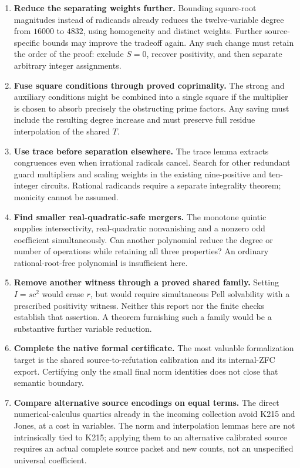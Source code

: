 \documentclass[11pt,a4paper]{article}
\theoremstyle{definition}\newtheorem{definition}[theorem]{Definition}
\theoremstyle{remark}\newtheorem{remark}[theorem]{Remark}
\numberwithin{equation}{section}
\begin{document}
\begin{enumerate}
\item \textbf{Reduce the separating weights further.} Bounding square-root
magnitudes instead of radicands already reduces the twelve-variable degree
from $16000$ to $4832$, using homogeneity and distinct weights. Further
source-specific bounds may improve the tradeoff again.
Any such change must retain the order of the proof: exclude $S=0$,
recover positivity, and then separate arbitrary integer assignments.
\item \textbf{Fuse square conditions through proved coprimality.} The
strong and auxiliary conditions might be combined into a single square
if the multiplier is chosen to absorb precisely the obstructing prime
factors. Any saving must include the resulting degree increase and must
preserve full residue interpolation of the shared $T$.
\item \textbf{Use trace before separation elsewhere.} The trace lemma
extracts congruences even when irrational radicals cancel. Search for
other redundant guard multipliers and scaling weights in the existing
nine-positive and ten-integer circuits. Rational radicands require a
separate integrality theorem; monicity cannot be assumed.
\item \textbf{Find smaller real-quadratic-safe mergers.} The monotone
quintic supplies intersectivity, real-quadratic nonvanishing and a
nonzero odd coefficient simultaneously. Can another polynomial reduce
the degree or number of operations while retaining all three properties?
An ordinary rational-root-free polynomial is insufficient here.
\item \textbf{Remove another witness through a proved shared family.}
Setting $I=sc^2$ would erase $r$, but would require simultaneous Pell
solvability with a prescribed positivity witness. Neither this report nor
the finite checks establish that assertion. A theorem furnishing such a
family would be a substantive further variable reduction.
\item \textbf{Complete the native formal certificate.} The most valuable
formalization target is the shared source-to-refutation calibration and
its internal-ZFC export. Certifying only the small final norm identities
does not close that semantic boundary.
\item \textbf{Compare alternative source encodings on equal terms.}
The direct numerical-calculus quartics already in the incoming collection
avoid K215 and Jones, at a cost in variables. The norm and interpolation
lemmas here are not intrinsically tied to K215; applying them to an
alternative calibrated source requires an actual complete source packet
and new counts, not an unspecified universal coefficient.
\end{enumerate}
\end{document}
